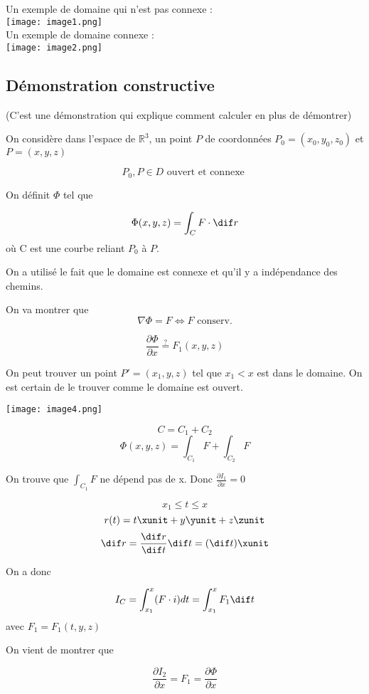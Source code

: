 Un exemple de domaine qui n'est pas connexe : \\
\texttt{[image: image1.png]}
\\
Un exemple de domaine connexe :
\\
\texttt{[image: image2.png]}

\subsection{Démonstration constructive}

(C'est une démonstration qui explique comment calculer en plus de démontrer)

On considère dans l'espace de $\mathbb{R}^3$, un point $P$ de coordonnées $P_0 = (x_0,y_0,z_0) $  et $P = (x,y,z)$

\[P_0, P \in D \text{ ouvert et connexe }\]

On définit $\Phi$ tel que

\[\Phi (x,y,z ) =\int_C F\cdot \dif r \]
où C est une courbe reliant $P_0$ à $P$.

On a utilisé le fait que le domaine est connexe et qu'il y a indépendance des chemins.

On va montrer que \[\nabla \Phi = F \Longleftrightarrow F \text{ conserv.} \]

\[\frac{\partial \Phi}{\partial x} \overset{?}{=} F_1 (x,y,z) \]

On peut trouver un point $P' = ( x_1,y,z)$ tel que $x_1 < x$ est dans le domaine. On est certain de le trouver comme le domaine est ouvert.

\texttt{[image: image4.png]}

\[C=C_1+C_2\]
\[\Phi (x,y,z) = \int_{C_1} F + \int_{C_2} F\]

On trouve que $\int_{C_1} F$ ne dépend pas de x. Donc $\frac{\partial I_1}{\partial x }=0$

\[x_1\leq t \leq x \]
\[r(t) = t \xunit +y\yunit + z \zunit \]
\[\dif r = \frac{\dif r}{\dif t}\dif t = (\dif t)\xunit\]

On a donc

\[I_C = \int_{x_1}^x (F\cdot i)dt = \int_{x_1}^x F_1 \dif t\] avec $F_1 = F_1 ( t,y,z )$

On vient de montrer que

\[\frac{\partial I_2	}{\partial x} = F_1 = \frac{\partial \Phi}{\partial x}\]


